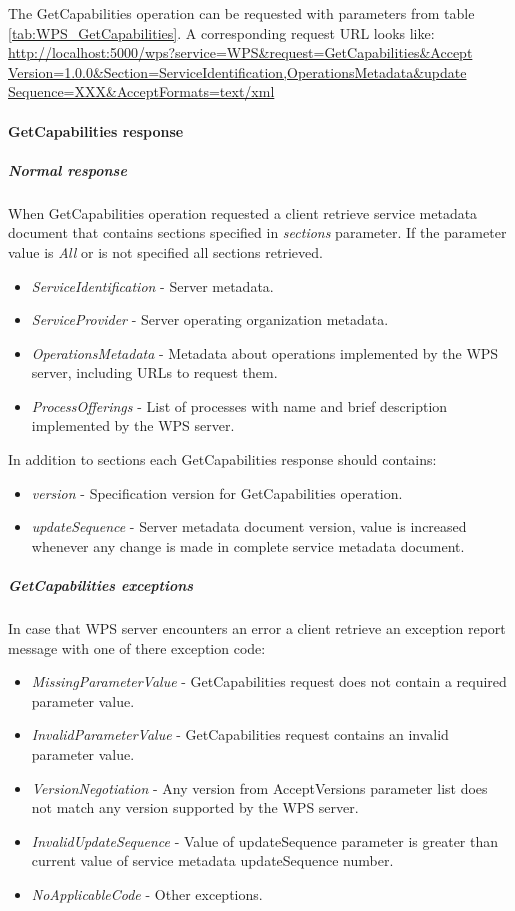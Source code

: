 \documentclass[12pt,a4paper]{article}
\begin{document}
The GetCapabilities operation can be requested with parameters from table \ref{tab:WPS_GetCapabilities}. A corresponding
request URL looks like:
\url{http://localhost:5000/wps?service=WPS&request=GetCapabilities&Accept
Version=1.0.0&Section=ServiceIdentification,OperationsMetadata&update
Sequence=XXX&AcceptFormats=text/xml}

\bigskip
\paragraph{GetCapabilities response}
\subparagraph{Normal response}
When GetCapabilities operation requested a client retrieve service metadata document that contains sections specified in
\textit{sections} parameter. If the parameter value is \textit{All} or is not specified all sections retrieved.

\begin{itemize}
\item\textit{ServiceIdentification} - Server metadata.
\item\textit{ServiceProvider} - Server operating organization metadata.
\item\textit{OperationsMetadata} - Metadata about operations implemented by the WPS server, including URLs to request them.
\item\textit{ProcessOfferings} - List of processes with name and brief description implemented by the WPS server.
\end{itemize}
In addition to sections each GetCapabilities response should contains:
\begin{itemize}
\item\textit{version} - Specification version for GetCapabilities operation.
\item\textit{updateSequence} - Server metadata document version, value is increased whenever any change is made in complete service metadata document.
\end{itemize}

\subparagraph{GetCapabilities exceptions}
In case that WPS server encounters an error a client retrieve an exception report message with one of there exception code:

\begin{itemize}
\item\textit{MissingParameterValue} - GetCapabilities request does not contain a required parameter value.
\item\textit{InvalidParameterValue} - GetCapabilities request contains an invalid parameter value.
\item\textit{VersionNegotiation} - Any version from AcceptVersions parameter list does not match any version supported by the WPS server.
\item\textit{InvalidUpdateSequence} - Value of updateSequence parameter is greater than current value of service metadata updateSequence number.
\item\textit{NoApplicableCode} - Other exceptions.
\end{itemize}
\end{document}
